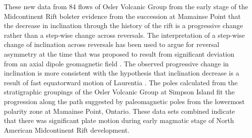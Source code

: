 \documentclass[draft,gc]{AGUTeX}
\begin{document}
\begin{article}
These new data from 84 flows of Osler Volcanic Group from the early stage of the Midcontinent Rift bolster evidence from the succession at Mamainse Point that the decrease in inclination through the history of the rift is a progressive change rather than a step-wise change across reversals. The interpretation of a step-wise change of inclination across reversals has been used to argue for reversal asymmetry at the time that was proposed to result from significant deviation from an axial dipole geomagnetic field \citep{Pesonen1981a}. The observed progressive change in inclination is more consistent with the hypothesis that inclination decrease is a result of fast equatorward motion of Laurentia \citep{Davis1997a, Swanson-Hysell2009a}. The poles calculated from the stratigraphic groupings of the Osler Volcanic Group at Simpson Island fit the progression along the path suggested by paleomagnetic poles from the lowermost polarity zone at Mamainse Point, Ontario. These data sets combined indicate that there was significant plate motion during early magmatic stage of North American Midcontinent Rift development.



\end{article}
\end{document}
